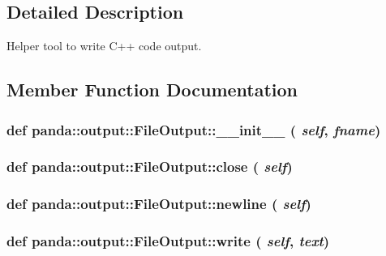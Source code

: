 \subsection{Detailed Description}
\begin{DoxyVerb}
Helper tool to write C++ code output.
\end{DoxyVerb}
 

\subsection{Member Function Documentation}
\hypertarget{classpanda_1_1output_1_1FileOutput_a2f1decc6bb966da75d2d43a1dccf2056}{
\subsubsection[{\_\-\_\-init\_\-\_\-}]{\setlength{\rightskip}{0pt plus 5cm}def panda::output::FileOutput::\_\-\_\-init\_\-\_\- ( {\em self}, \/   {\em fname})}}
\label{classpanda_1_1output_1_1FileOutput_a2f1decc6bb966da75d2d43a1dccf2056}
\hypertarget{classpanda_1_1output_1_1FileOutput_a0834ae21cba566b60d8e642a18a22aea}{
\subsubsection[{close}]{\setlength{\rightskip}{0pt plus 5cm}def panda::output::FileOutput::close ( {\em self})}}
\label{classpanda_1_1output_1_1FileOutput_a0834ae21cba566b60d8e642a18a22aea}
\hypertarget{classpanda_1_1output_1_1FileOutput_ae52305e0db6d0b877d1b714a5273925e}{
\subsubsection[{newline}]{\setlength{\rightskip}{0pt plus 5cm}def panda::output::FileOutput::newline ( {\em self})}}
\label{classpanda_1_1output_1_1FileOutput_ae52305e0db6d0b877d1b714a5273925e}
\hypertarget{classpanda_1_1output_1_1FileOutput_ad5e62836f30b0d232e5ce5e7afc8a82c}{
\subsubsection[{write}]{\setlength{\rightskip}{0pt plus 5cm}def panda::output::FileOutput::write ( {\em self}, \/   {\em text})}}
